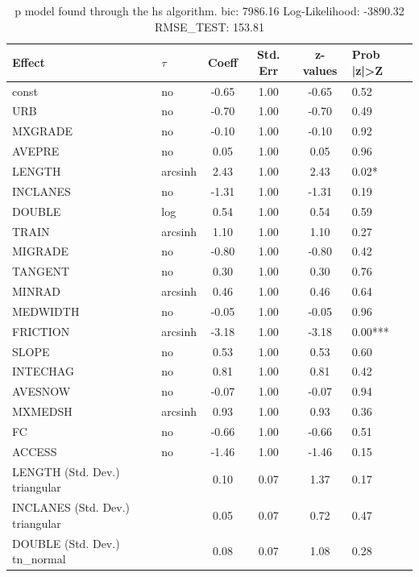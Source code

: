 \begin{table}
	\caption{p model found through the hs algorithm. bic: 7986.16 Log-Likelihood: -3890.32 RMSE_TEST: 153.81}
	\begin{center}
		\begin{tabular}{|l|l|c|c|c|l|}
			\hline
			Effect & $\tau$ & Coeff & Std. Err & z-values & Prob |z|>Z \\
			\hline
			const & no & -0.65 & 1.00 & -0.65 & 0.52 \\
			\hline
			URB & no & -0.70 & 1.00 & -0.70 & 0.49 \\
			\hline
			MXGRADE & no & -0.10 & 1.00 & -0.10 & 0.92 \\
			\hline
			AVEPRE & no & 0.05 & 1.00 & 0.05 & 0.96 \\
			\hline
			LENGTH & arcsinh & 2.43 & 1.00 & 2.43 & 0.02* \\
			\hline
			INCLANES & no & -1.31 & 1.00 & -1.31 & 0.19 \\
			\hline
			DOUBLE & log & 0.54 & 1.00 & 0.54 & 0.59 \\
			\hline
			TRAIN & arcsinh & 1.10 & 1.00 & 1.10 & 0.27 \\
			\hline
			MIGRADE & no & -0.80 & 1.00 & -0.80 & 0.42 \\
			\hline
			TANGENT & no & 0.30 & 1.00 & 0.30 & 0.76 \\
			\hline
			MINRAD & arcsinh & 0.46 & 1.00 & 0.46 & 0.64 \\
			\hline
			MEDWIDTH & no & -0.05 & 1.00 & -0.05 & 0.96 \\
			\hline
			FRICTION & arcsinh & -3.18 & 1.00 & -3.18 & 0.00*** \\
			\hline
			SLOPE & no & 0.53 & 1.00 & 0.53 & 0.60 \\
			\hline
			INTECHAG & no & 0.81 & 1.00 & 0.81 & 0.42 \\
			\hline
			AVESNOW & no & -0.07 & 1.00 & -0.07 & 0.94 \\
			\hline
			MXMEDSH & arcsinh & 0.93 & 1.00 & 0.93 & 0.36 \\
			\hline
			FC & no & -0.66 & 1.00 & -0.66 & 0.51 \\
			\hline
			ACCESS & no & -1.46 & 1.00 & -1.46 & 0.15 \\
			\hline
			LENGTH (Std. Dev.) triangular &  & 0.10 & 0.07 & 1.37 & 0.17 \\
			\hline
			INCLANES (Std. Dev.) triangular &  & 0.05 & 0.07 & 0.72 & 0.47 \\
			\hline
			DOUBLE (Std. Dev.) tn_normal &  & 0.08 & 0.07 & 1.08 & 0.28 \\

\end{tabular}
\end{center}
\end{table}
